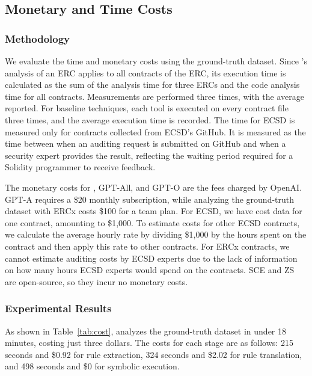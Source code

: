 \subsection{Monetary and Time Costs}



\subsubsection{Methodology}
We evaluate the time and monetary costs using the ground-truth dataset. 
Since \Tool{}'s analysis of an ERC 
applies to all contracts of the ERC, its execution time is 
calculated as the sum of the analysis time for three ERCs and the 
code analysis time for all contracts. Measurements are performed 
three times, with the average reported.
For baseline techniques, each tool is executed on every contract 
file three times, and the average execution time is recorded. The 
time for ECSD is measured only for contracts collected from ECSD’s GitHub. 
It is measured as the time between when an auditing request is 
submitted on GitHub and when a security expert provides the 
result, reflecting the waiting period required for a Solidity 
programmer to receive feedback. 


The monetary costs for \Tool{}, GPT-All, and GPT-O are the fees charged by OpenAI. 
GPT-A requires a \$20 monthly subscription, 
while analyzing the ground-truth dataset with ERCx costs \$100 for a team plan. 
For ECSD, we have cost data for one contract, amounting to \$1,000. 
To estimate costs for other ECSD contracts, we calculate the average hourly 
rate by dividing \$1,000 by the hours spent on the contract 
and then apply this rate to other contracts. For ERCx contracts, 
we cannot estimate auditing costs by ECSD experts due to the lack of information 
on how many hours ECSD experts would spend on the contracts. 
SCE and ZS are open-source, so they incur no monetary costs.





\subsubsection{Experimental Results}
As shown in Table~\ref{tab:cost}, \Tool{} analyzes the ground-truth dataset in 
under 18 minutes, costing just three dollars. The costs for each stage are as 
follows: 215 seconds and \$0.92 for rule extraction, 324 seconds and \$2.02 for rule translation, 
and 498 seconds and \$0 for symbolic execution.

